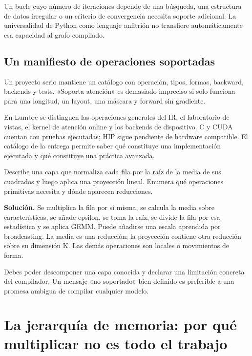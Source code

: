 \documentclass[12pt,a4paper,oneside]{report}
\begin{document}
Un bucle cuyo número de iteraciones depende de una búsqueda, una estructura de datos irregular o un criterio de convergencia necesita soporte adicional. La universalidad de Python como lenguaje anfitrión no transfiere automáticamente esa capacidad al grafo compilado.

\section{Un manifiesto de operaciones soportadas}
Un proyecto serio mantiene un catálogo con operación, tipos, formas, backward, backends y tests. «Soporta atención» es demasiado impreciso si solo funciona para una longitud, un layout, una máscara y forward sin gradiente.

En Lumbre se distinguen las operaciones generales del IR, el laboratorio de vistas, el kernel de atención online y los backends de dispositivo. C y CUDA cuentan con pruebas ejecutadas; HIP sigue pendiente de hardware compatible. El catálogo de la entrega permite saber qué constituye una implementación ejecutada y qué constituye una práctica avanzada.

\begin{practica}
Describe una capa que normaliza cada fila por la raíz de la media de sus cuadrados y luego aplica una proyección lineal. Enumera qué operaciones primitivas necesita y dónde aparecen reducciones.

\end{practica}
\textbf{Solución.} Se multiplica la fila por sí misma, se calcula la media sobre características, se añade epsilon, se toma la raíz, se divide la fila por esa estadística y se aplica GEMM. Puede añadirse una escala aprendida por broadcasting. La media es una reducción; la proyección contiene otra reducción sobre su dimensión K. Las demás operaciones son locales o movimientos de forma.

\begin{comprueba}
Debes poder descomponer una capa conocida y declarar una limitación concreta del compilador. Un mensaje «no soportado» bien definido es preferible a una promesa ambigua de compilar cualquier modelo.

\end{comprueba}

\chapter{La jerarquía de memoria: por qué multiplicar no es todo el trabajo}
\label{ch:jerarquia}
\end{document}
